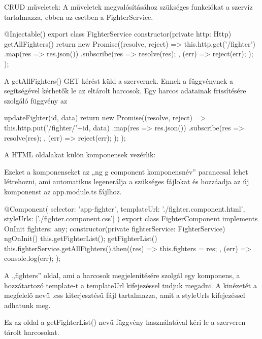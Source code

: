 
CRUD műveletek: A műveletek megvalósításához szükséges funkciókat a szervíz tartalmazza, ebben az esetben a FighterService.

\begin{cpp}
@Injectable()
export class FighterService {
  constructor(private http: Http) { }
  getAllFighters() {
    return new Promise((resolve, reject) => {
      this.http.get('/fighter')
        .map(res => res.json())
        .subscribe(res => {
          resolve(res);
        }, (err) => {
          reject(err);
        });
    });  }  }
\end{cpp}

A getAllFighters() GET kérést küld a szervernek. Ennek a függvénynek a segítségével kérhetők le az eltárolt harcosok.
Egy harcos adatainak frissítésére szolgáló függvény az 

\begin{cpp}
updateFighter(id, data) {
    return new Promise((resolve, reject) => {
        this.http.put('/fighter/'+id, data)
          .map(res => res.json())
          .subscribe(res => {
            resolve(res);
          }, (err) => {
            reject(err);
          });
    });
  }
\end{cpp}

A HTML oldalakat külön komponensek vezérlik:

Ezeket a komponenseket az „ng g component komponensnév” paranccsal lehet létrehozni, ami automatikus legenerálja a szükséges fájlokat és hozzáadja az új komponenst az app.module.ts fájlhoz.

\begin{cpp}
@Component({
  selector: 'app-fighter',
  templateUrl: './fighter.component.html',
  styleUrls: ['./fighter.component.css']
})
export class FighterComponent implements OnInit {
  fighters: any;
  constructor(private fighterService: FighterService) { }
  ngOnInit() {
    this.getFighterList();
  }
  getFighterList() {
    this.fighterService.getAllFighters().then((res) => {
      this.fighters = res;
    }, (err) => {
      console.log(err);
    });}}
\end{cpp}

A „fighters” oldal, ami a harcosok megjelenítésére szolgál egy komponens, a hozzátartozó template-t a templateUrl kifejezéssel tudjuk megadni. A kinézetét a megfelelő nevű .css kiterjesztésű fájl tartalmazza, amit a styleUrls kifejezéssel adhatunk meg.

Ez az oldal a getFighterList() nevű függvény használatával kéri le a szerveren tárolt harcosokat.

